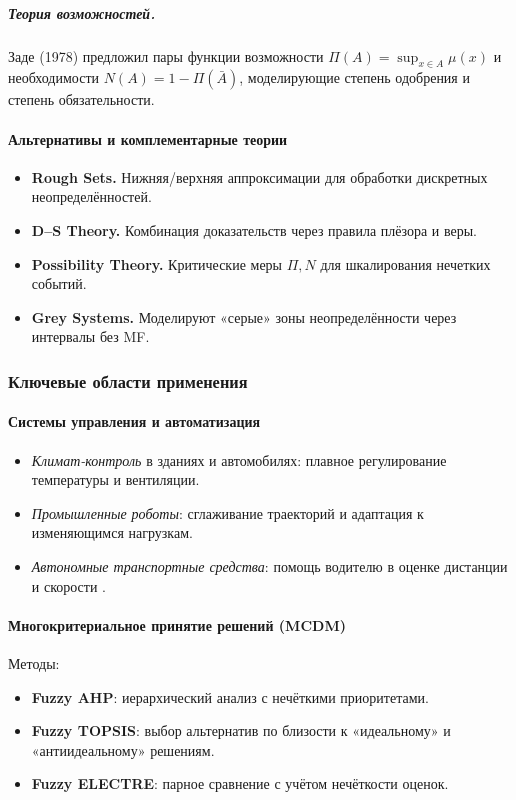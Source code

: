 \subparagraph{Теория возможностей.}  

Заде (1978) предложил пары функции возможности $\Pi(A)=\sup_{x\in A}\mu(x)$ и необходимости $N(A)=1-\Pi(\bar A)$, моделирующие степень одобрения и степень обязательности.


\paragraph{Альтернативы и комплементарные теории}

\begin{itemize}
  \item \textbf{Rough Sets.} Нижняя/верхняя аппроксимации для обработки дискретных неопределённостей.
  \item \textbf{D–S Theory.} Комбинация доказательств через правила плёзора и веры.
  \item \textbf{Possibility Theory.} Критические меры $\Pi,N$ для шкалирования нечетких событий.
  \item \textbf{Grey Systems.} Моделируют «серые» зоны неопределённости через интервалы без MF.
\end{itemize}

\subsubsection{Ключевые области применения}
\label{subsec:applications}

\paragraph{Системы управления и автоматизация}
\begin{itemize}
  \item \emph{Климат-контроль} в зданиях и автомобилях: плавное регулирование температуры и вентиляции.
  \item \emph{Промышленные роботы}: сглаживание траекторий и адаптация к изменяющимся нагрузкам.
  \item \emph{Автономные транспортные средства}: помощь водителю в оценке дистанции и скорости \cite{Ross2004}.
\end{itemize}

\paragraph{Многокритериальное принятие решений (MCDM)}

Методы:
\begin{itemize}
  \item \textbf{Fuzzy AHP}: иерархический анализ с нечёткими приоритетами.
  \item \textbf{Fuzzy TOPSIS}: выбор альтернатив по близости к «идеальному» и «антиидеальному» решениям.
  \item \textbf{Fuzzy ELECTRE}: парное сравнение с учётом нечёткости оценок.
\end{itemize}

